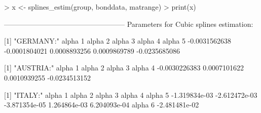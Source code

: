 \begin{Schunk}
\begin{Sinput}
> x <- splines_estim(group, bonddata, matrange)
> print(x)
\end{Sinput}
\begin{Soutput}
---------------------------------------------------
Parameters for Cubic splines estimation:

[1] "GERMANY:"
      alpha 1       alpha 2       alpha 3       alpha 4       alpha 5 
-0.0031562638 -0.0001804021  0.0008893256  0.0009869789 -0.0235685086 

[1] "AUSTRIA:"
      alpha 1       alpha 2       alpha 3       alpha 4 
-0.0030226383  0.0007101622  0.0010939255 -0.0234513152 

[1] "ITALY:"
      alpha 1       alpha 2       alpha 3       alpha 4       alpha 5 
-1.319834e-03 -2.612472e-03 -3.871354e-05  1.264864e-03  6.204093e-04 
      alpha 6 
-2.481481e-02 
\end{Soutput}
\end{Schunk}


